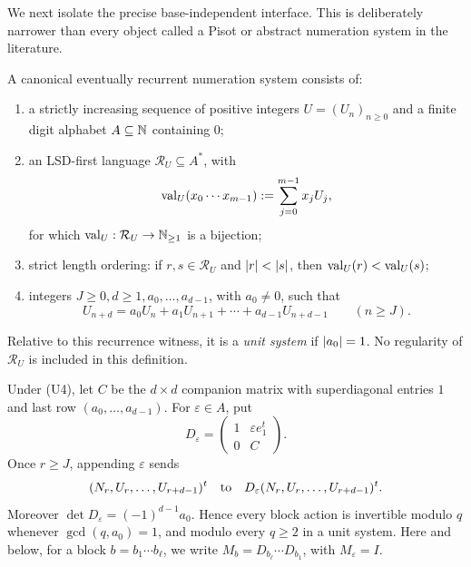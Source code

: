 We next isolate the precise base-independent interface. This is
deliberately narrower than every object called a Pisot or abstract
numeration system in the literature.

\begin{definition}
  \label{def:canonical-eventually-recurrent-numeration}
  A canonical eventually recurrent numeration system consists of:
  \begin{enumerate}[label=\textup{(U\arabic*)}]
    \item a strictly increasing sequence of positive integers
    \(U=(U_n)_{n\ge0}\) and a finite digit alphabet
    \(A\subseteq\mathbb{N}\) containing \(0\);
    \item an LSD-first language \(\mathcal R_U\subseteq A^\ast\), with
    \[
      \operatorname{val}_U(x_0\cdots x_{m-1})
        :=\sum_{j=0}^{m-1}x_jU_j,
    \]
    for which \(\operatorname{val}_U:\mathcal R_U\to\mathbb{N}_{\ge1}\) is a bijection;
    \item strict length ordering: if \(r,s\in\mathcal R_U\) and
    \(\lvert r \rvert<\lvert s \rvert\), then \(\operatorname{val}_U(r)<\operatorname{val}_U(s)\);
    \item integers \(J\ge0,d\ge1,a_0,\ldots,a_{d-1}\), with
    \(a_0\ne0\), such that
    \[
      U_{n+d}=a_0U_n+a_1U_{n+1}+\cdots+a_{d-1}U_{n+d-1}
      \qquad(n\ge J).
    \]
  \end{enumerate}
  Relative to this recurrence witness, it is a \emph{unit system} if
  \(\lvert a_0 \rvert=1\). No regularity of \(\mathcal R_U\) is included in
  this definition.
\end{definition}

\begin{lemma}
  \label{lem:affine-recurrence-block-action}
  Under \textup{(U4)}, let \(C\) be the \(d\times d\) companion matrix
  with superdiagonal entries \(1\) and last row
  \((a_0,\ldots,a_{d-1})\). For \(\varepsilon\in A\), put
  \[
    D_\varepsilon=
    \begin{pmatrix}
      1&\varepsilon e_1^t\\
      0&C
    \end{pmatrix}.
  \]
  Once \(r\ge J\), appending \(\varepsilon\) sends
  \[
    (N_r,U_r,\ldots,U_{r+d-1})^t
    \quad\hbox{to}\quad
    D_\varepsilon(N_r,U_r,\ldots,U_{r+d-1})^t.
  \]
  Moreover
  \(\det D_\varepsilon=(-1)^{d-1}a_0\). Hence every block action is
  invertible modulo \(q\) whenever \(\gcd(q,a_0)=1\), and modulo every
  \(q\ge2\) in a unit system. Here and below, for a block
  \(b=b_1\cdots b_\ell\), we write
  \(M_b=D_{b_\ell}\cdots D_{b_1}\), with \(M_\varepsilon=I\).
\end{lemma}

